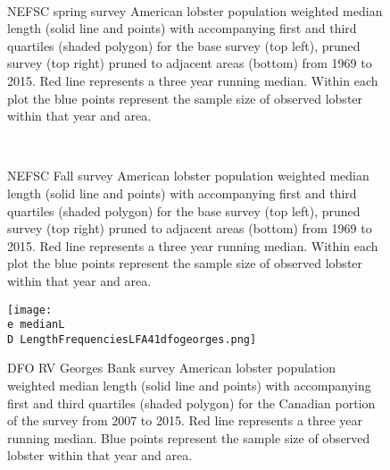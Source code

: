 \documentclass[11pt]{article}
\newcommand{\D}{.}
\newcommand{\e}{/backup/bio_data/bio.lobster/figures/} %
\begin{document}
\begin{figure}
\centering
{}
\\
\caption{NEFSC spring survey American lobster population weighted median length (solid line and points) with accompanying first and third quartiles (shaded polygon) for the base survey (top left), pruned survey (top right) pruned to adjacent areas (bottom) from 1969 to 2015. Red line represents a three year running median. Within each plot the blue points represent the sample size of observed lobster within that year and area. }
\end{figure}
\clearpage



\begin{figure}
\centering
{}
\\
\caption{NEFSC Fall survey American lobster population weighted median length (solid line and points) with accompanying first and third quartiles (shaded polygon) for the base survey (top left), pruned survey (top right) pruned to adjacent areas (bottom) from 1969 to 2015. Red line represents a three year running median. Within each plot the blue points represent the sample size of observed lobster within that year and area. }
\end{figure}
\clearpage


\begin{figure}

    \texttt{[image: \\e medianL\\D LengthFrequenciesLFA41dfogeorges.png]}
    \caption{DFO RV Georges Bank survey American lobster population weighted median length (solid line and points) with accompanying first and third quartiles (shaded polygon) for the Canadian portion of the survey from 2007 to 2015. Red line represents a three year running median. Blue points represent the sample size of observed lobster within that year and area.}

\end{figure}
\end{document}
